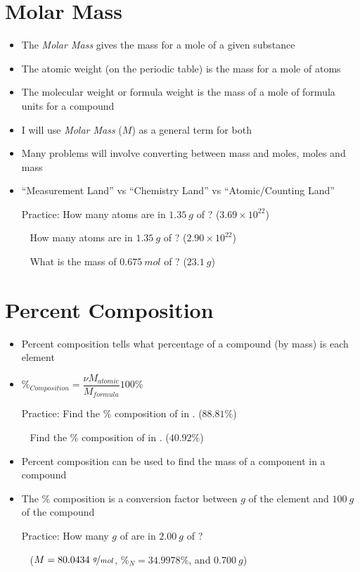 \documentclass[12pt, openany, letterpaper]{memoir}
\begin{document}
\section{Molar Mass}
\begin{itemize}
	\item The \emph{Molar Mass} gives the mass for a mole of a given substance
	\item The atomic weight (on the periodic table) is the mass for a mole of atoms
	\item The molecular weight or formula weight is the mass of a mole of formula units for a compound
	\item I will use \emph{Molar Mass} ($M$) as a general term for both
	\item Many problems will involve converting between mass and moles, moles and mass
	\item ``Measurement Land'' vs ``Chemistry Land'' vs ``Atomic/Counting Land''

	      Practice: How many  atoms are in $1.35~g$ of ? ($3.69\times10^{22}$)

	      ~\hphantom{Practice:} How many  atoms are in $1.35~g$ of ? ($2.90\times10^{22}$)

	      ~\hphantom{Practice:} What is the mass of $0.675~mol$ of ? ($23.1~g$)
\end{itemize}
\section{Percent Composition}
\begin{itemize}
	\item Percent composition tells what percentage of a compound (by mass) is each element
	\item $\%_{Composition}=\dfrac{\nu M_{atomic}}{M_{formula}}100\%$

	      Practice: Find the \% composition of  in . ($88.81\%$)

	      ~\hphantom{Practice:} Find the \% composition of  in . ($40.92\%$)
	\item Percent composition can be used to find the mass of a component in a compound
	\item The \% composition is a conversion factor between $g$ of the element and $100~g$ of the compound

	      Practice: How many $g$ of  are in $2.00~g$ of ?

	      ~\hphantom{Practice:} ($M=80.0434~\nicefrac{g}{mol}$, $\%_N=34.9978\%$, and $0.700~g$)
\end{itemize}
\end{document}
